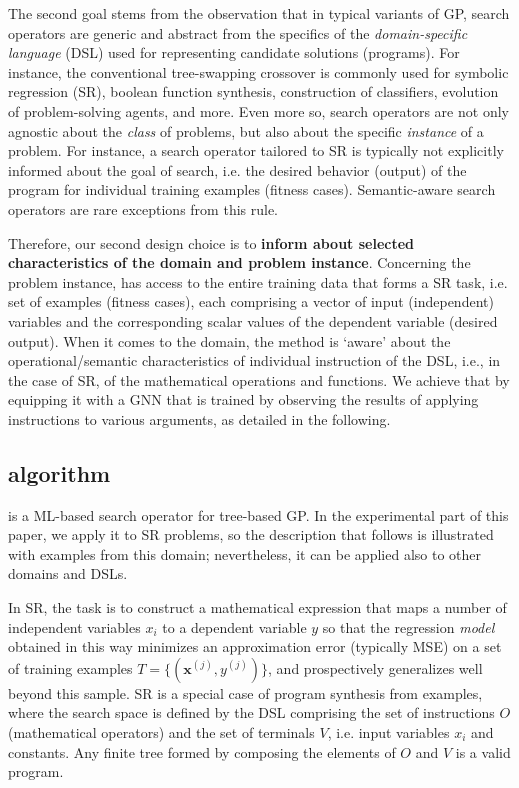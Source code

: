 The second goal stems from the observation that in typical variants of GP, search operators are generic and abstract from the specifics of the \emph{domain-specific language} (DSL) used for representing candidate solutions (programs). For instance, the conventional tree-swapping crossover is commonly used for symbolic regression (SR), boolean function synthesis, construction of classifiers, evolution of problem-solving agents, and more. Even more so, search operators are not only agnostic about the \textit{class} of problems, but also about the specific \textit{instance} of a problem. For instance, a search operator tailored to SR is typically not explicitly informed about the goal of search, i.e. the desired behavior (output) of the program for individual training examples (fitness cases). Semantic-aware search operators are rare exceptions from this rule. 

Therefore, our second design choice is to \textbf{inform \mname  about selected characteristics of the domain and problem instance}. Concerning the problem instance, \mname has access to the entire training data that forms a SR task, i.e. set of examples (fitness cases), each comprising a vector of input (independent) variables and the corresponding scalar values of the dependent variable (desired output). %
When it comes to the domain, the method is `aware' about the operational/semantic characteristics of individual instruction of the DSL, i.e., in the case of SR, of the mathematical operations and functions. We achieve that by equipping it with a GNN that is trained by observing the results of applying instructions to various arguments, as detailed in the following.  



\subsection{\mname algorithm}

\mname is a ML-based search operator for tree-based GP. In the experimental part of this paper, we apply it to SR problems, so the description that follows is illustrated with examples from this domain; nevertheless, it can be applied also to other domains and DSLs. 

In SR, the task is to construct a mathematical expression that maps a number of independent variables $x_i$ to a dependent variable $y$ so that the regression \emph{model} obtained in this way minimizes an approximation error (typically MSE) on a set of training examples $T=\{(\mathbf{x}^{(j)},y^{(j)})\}$, and prospectively generalizes well beyond this sample. SR is a special case of program synthesis from examples, where the search space is defined by the DSL comprising the set of instructions $O$ (mathematical operators) and the set of terminals $V$, i.e. input variables $x_i$ and constants. Any finite tree formed by composing the elements of $O$ and $V$ is a valid program. 

